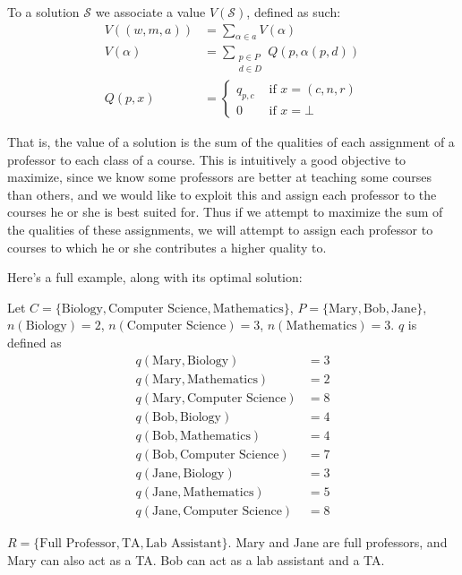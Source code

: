 To a solution $\mathcal{S}$ we associate a value $V(\mathcal{S})$, defined as such:
\begin{align*}
V((w, m, a)) &= \sum_{\alpha \in a} V(\alpha)\\
V(\alpha) &= \sum_{\substack{p \in P \\d \in D}} Q(p, \alpha(p, d))\\
Q(p, x) &= \begin{cases}
q_{p, c} & \text{ if } x = (c, n, r)\\
0 &\text{ if } x = \bot
\end{cases}
\end{align*}

That is, the value of a solution is the sum of the qualities of each assignment of a professor to each class of a course. This is intuitively a good objective to maximize, since we know some professors are better at teaching some courses than others, and we would like to exploit this and assign each professor to the courses he or she is best suited for. Thus if we attempt to maximize the sum of the qualities of these assignments, we will attempt to assign each professor to courses to which he or she contributes a higher quality to.

Here's a full example, along with its optimal solution:

Let $C = \{\text{Biology}, \text{Computer Science}, \text{Mathematics}\}$, $P = \{\text{Mary}, \text{Bob}, \text{Jane}\}$, $n(\text{Biology}) = 2$, $n(\text{Computer Science}) = 3$, $n(\text{Mathematics}) = 3$. $q$ is defined as
\begin{align*}
  q(\text{Mary}, \text{Biology}) &= 3\\
  q(\text{Mary}, \text{Mathematics}) &= 2\\
  q(\text{Mary}, \text{Computer Science}) &= 8\\
  q(\text{Bob}, \text{Biology}) &= 4\\
  q(\text{Bob}, \text{Mathematics}) &= 4\\
  q(\text{Bob}, \text{Computer Science}) &= 7\\
  q(\text{Jane}, \text{Biology}) &= 3\\
  q(\text{Jane}, \text{Mathematics}) &= 5\\
  q(\text{Jane}, \text{Computer Science}) &= 8
\end{align*}

$R = \{\text{Full Professor}, \text{TA}, \text{Lab Assistant}\}$. Mary and Jane are full professors, and Mary can also act as a TA. Bob can act as a lab assistant and a TA.

